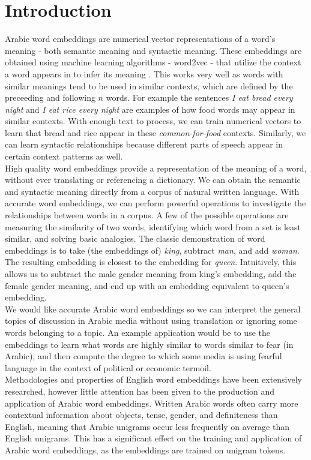 \section{Introduction}


Arabic word embeddings are numerical vector representations of a word's meaning - both semantic meaning and syntactic meaning. These embeddings are obtained using machine learning algorithms - word2vec - that utilize the context a word appears in to infer its meaning \cite{mikolovdist:2013, mikoloveffic:2013}. This works very well as words with similar meanings tend to be used in similar contexts, which are defined by the preceeding and following $n$ words. For example the sentences \textit{I eat bread every night} and \textit{I eat rice every night} are examples of how food words may appear in similar contexts. With enough text to process, we can train numerical vectors to learn that bread and rice appear in these \textit{common-for-food} contexts. Similarly, we can learn syntactic relationships because different parts of speech appear in certain context patterns as well.
\\
High quality word embeddings provide a representation of the meaning of a word, without ever translating or referencing a dictionary. We can obtain the semantic and syntactic meaning directly from a corpus of natural written language. With accurate word embeddings, we can perform powerful operations to investigate the relationships between words in a corpus. A few of the possible operations are measuring the similarity of two words, identifying which word from a set is least similar, and solving basic analogies. The classic demonstration of word embeddings is to take (the embeddings of) \textit{king}, subtract \textit{man}, and add \textit{woman}. The resulting embedding is closest to the embedding for \textit{queen}. Intuitively, this allows us to subtract the male gender meaning from king's embedding, add the female gender meaning, and end up with an embedding equivalent to queen's embedding.
\\
We would like accurate Arabic word embeddings so we can interpret the general topics of discussion in Arabic media without using translation or ignoring some words belonging to a topic. An example application would be to use the embeddings to learn what words are highly similar to words similar to fear (in Arabic), and then compute the degree to which some media is using fearful language in the context of political or economic termoil.
\\
Methodologies and properties of English word embeddings have been extensively researched, however little attention has been given to the production and application of Arabic word embeddings. Written Arabic words often carry more contextual information about objects, tense, gender, and definiteness than English, meaning that Arabic unigrams occur less frequently on average than English unigrams. This has a significant effect on the training and application of Arabic word embeddings, as the embeddings are trained on unigram tokens.
